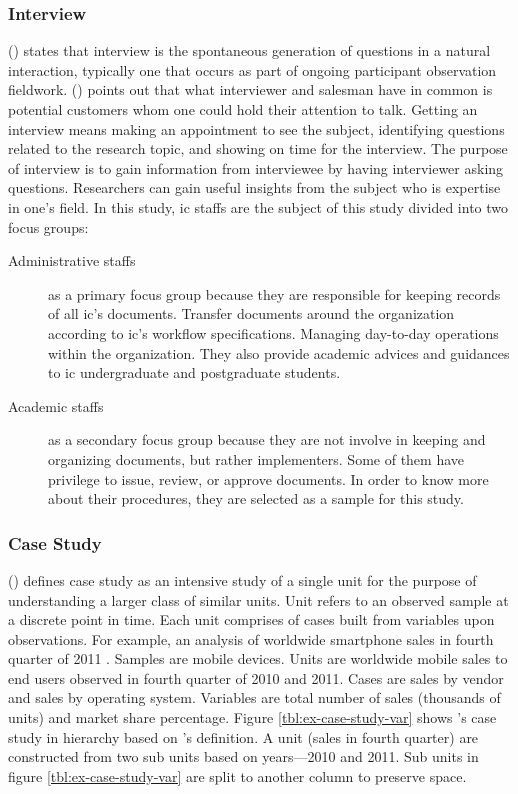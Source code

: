 \subsubsection{Interview}
\citeauthor{gall7j} (\citeyear{gall7j}) states that interview is the spontaneous generation of questions in a natural interaction, typically one that occurs as part of ongoing participant observation fieldwork.
\citeauthor{brady2011craft} (\citeyear{brady2011craft}) points out that what interviewer and salesman have in common is potential customers whom one could hold their attention to talk.
Getting an interview means making an appointment to see the subject, identifying questions related to the research topic, and showing on time for the interview.
The purpose of interview is to gain information from interviewee by having interviewer asking questions.
Researchers can gain useful insights from the subject who is expertise in one's field.
In this study, \gls{ic} staffs are the subject of this study divided into two focus groups:
\begin{description}
	\item [Administrative staffs] as a primary focus group because they are responsible for keeping records of all \gls{ic}'s documents.
	Transfer documents around the organization according to \gls{ic}'s workflow specifications.
	Managing day-to-day operations within the organization.
	They also provide academic advices and guidances to \gls{ic} undergraduate and postgraduate students.
	\item [Academic staffs] as a secondary focus group because they are not involve in keeping and organizing documents, but rather implementers.
	Some of them have privilege to issue, review, or approve documents.
	In order to know more about their procedures, they are selected as a sample for this study.
\end{description}

\subsubsection{Case Study}
\citeauthor{merriam1988case} (\citeyear{merriam1988case}) defines case study as an intensive study of a single unit for the purpose of understanding a larger class of similar units.
Unit refers to an observed sample at a discrete point in time.
Each unit comprises of cases built from variables upon observations.
For example, an analysis of worldwide smartphone sales in fourth quarter of 2011 \cite{goasduff2012gartner}.
Samples are mobile devices.
Units are worldwide mobile sales to end users observed in fourth quarter of 2010 and 2011.
Cases are sales by vendor and sales by operating system.
Variables are total number of sales (thousands of units) and market share percentage.
Figure \ref{tbl:ex-case-study-var} shows \citeauthor{goasduff2012gartner}'s case study \cite{goasduff2012gartner} in hierarchy based on \citeauthor{merriam1988case}'s definition.
A unit (sales in fourth quarter) are constructed from two sub units based on years---2010 and 2011.
Sub units in figure \ref{tbl:ex-case-study-var} are split to another column to preserve space.

